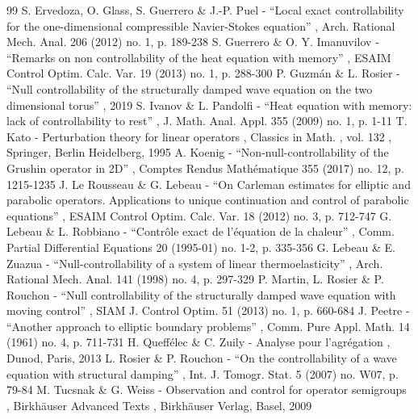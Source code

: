 \documentclass[11pt]{article}
\theoremstyle{plain}
\theoremstyle{definition}
\theoremstyle{remark}
\begin{document}
\begin{thebibliography}{99}
 S. Ervedoza, O. Glass, S. Guerrero \& J.-P. Puel - “Local exact controllability for the one-dimensional compressible Navier-Stokes equation” , Arch. Rational Mech. Anal. 206 (2012) no. 1, p. 189-238
 S. Guerrero \& O. Y. Imanuvilov - “Remarks on non controllability of the heat equation with memory” , ESAIM Control Optim. Calc. Var. 19 (2013) no. 1, p. 288-300
 P. Guzmán \& L. Rosier - “Null controllability of the structurally damped wave equation on the two dimensional torus” , 2019
 S. Ivanov \& L. Pandolfi - “Heat equation with memory: lack of controllability to rest” , J. Math. Anal. Appl. 355 (2009) no. 1, p. 1-11
 T. Kato - Perturbation theory for linear operators , Classics in Math. , vol. 132 , Springer, Berlin Heidelberg, 1995
 A. Koenig - “Non-null-controllability of the Grushin operator in 2D” , Comptes Rendus Mathématique 355 (2017) no. 12, p. 1215-1235
 J. Le Rousseau \& G. Lebeau - “On Carleman estimates for elliptic and parabolic operators. Applications to unique continuation and control of parabolic equations” , ESAIM Control Optim. Calc. Var. 18 (2012) no. 3, p. 712-747
 G. Lebeau \& L. Robbiano - “Contrôle exact de l’équation de la chaleur” , Comm. Partial Differential Equations 20 (1995-01) no. 1-2, p. 335-356
 G. Lebeau \& E. Zuazua - “Null-controllability of a system of linear thermoelasticity” , Arch. Rational Mech. Anal. 141 (1998) no. 4, p. 297-329
 P. Martin, L. Rosier \& P. Rouchon - “Null controllability of the structurally damped wave equation with moving control” , SIAM J. Control Optim. 51 (2013) no. 1, p. 660-684
 J. Peetre - “Another approach to elliptic boundary problems” , Comm. Pure Appl. Math. 14 (1961) no. 4, p. 711-731
 H. Queffélec \& C. Zuily - Analyse pour l’agrégation , Dunod, Paris, 2013
 L. Rosier \& P. Rouchon - “On the controllability of a wave equation with structural damping” , Int. J. Tomogr. Stat. 5 (2007) no. W07, p. 79-84
 M. Tucsnak \& G. Weiss - Observation and control for operator semigroups , Birkhäuser Advanced Texts , Birkhäuser Verlag, Basel, 2009
\end{thebibliography}
\end{document}

